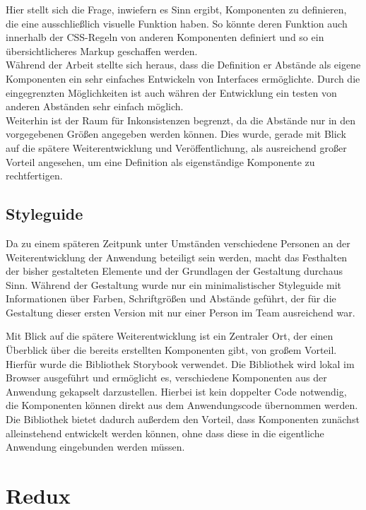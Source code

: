 Hier stellt sich die Frage, inwiefern es Sinn ergibt, Komponenten zu definieren, die eine ausschließlich visuelle Funktion haben.
So könnte deren Funktion auch innerhalb der CSS-Regeln von anderen Komponenten definiert und so ein übersichtlicheres Markup geschaffen werden.\\
Während der Arbeit stellte sich heraus, dass die Definition er Abstände als eigene Komponenten ein sehr einfaches Entwickeln von Interfaces ermöglichte. Durch die eingegrenzten Möglichkeiten ist auch währen der Entwicklung ein testen von anderen Abständen sehr einfach möglich.\\
Weiterhin ist der Raum für Inkonsistenzen begrenzt, da die Abstände nur in den vorgegebenen Größen angegeben werden können. Dies wurde, gerade mit Blick auf die spätere Weiterentwicklung und Veröffentlichung, als ausreichend großer Vorteil angesehen, um eine Definition als eigenständige Komponente zu rechtfertigen.

\subsection{Styleguide}
\label{chap:styleguide}
Da zu einem späteren Zeitpunk unter Umständen verschiedene Personen an der Weiterentwicklung der Anwendung beteiligt sein werden, macht das Festhalten der bisher gestalteten Elemente und der Grundlagen der Gestaltung durchaus Sinn.
Während der Gestaltung wurde nur ein minimalistischer Styleguide mit Informationen über Farben, Schriftgrößen und Abstände geführt, der für die Gestaltung dieser ersten Version mit nur einer Person im Team ausreichend war.

Mit Blick auf die spätere Weiterentwicklung ist ein Zentraler Ort, der einen Überblick über die bereits erstellten Komponenten gibt, von großem Vorteil.
Hierfür wurde die Bibliothek Storybook\footnotemark{} verwendet. Die Bibliothek wird lokal im Browser ausgeführt und ermöglicht es, verschiedene Komponenten aus der Anwendung gekapselt darzustellen. Hierbei ist kein doppelter Code notwendig, die Komponenten können direkt aus dem Anwendungscode übernommen werden.
Die Bibliothek bietet dadurch außerdem den Vorteil, dass Komponenten zunächst alleinstehend entwickelt werden können, ohne dass diese in die eigentliche Anwendung eingebunden werden müssen.


\section{Redux}
\label{chap:redux}

